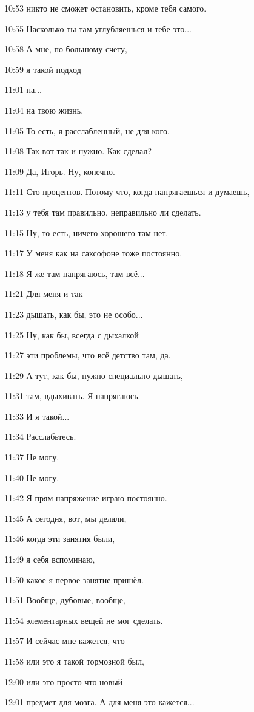 10:53
никто не сможет остановить, кроме тебя самого.

10:55
Насколько ты там углубляешься и тебе это...

10:58
А мне, по большому счету,

10:59
я такой подход

11:01
на...

11:04
на твою жизнь.

11:05
То есть, я расслабленный, не для кого.

11:08
Так вот так и нужно. Как сделал?

11:09
Да, Игорь. Ну, конечно.

11:11
Сто процентов. Потому что, когда напрягаешься и думаешь,

11:13
у тебя там правильно, неправильно ли сделать.

11:15
Ну, то есть, ничего хорошего там нет.

11:17
У меня как на саксофоне тоже постоянно.

11:18
Я же там напрягаюсь, там всё...

11:21
Для меня и так

11:23
дышать, как бы, это не особо...

11:25
Ну, как бы, всегда с дыхалкой

11:27
эти проблемы, что всё детство там, да.

11:29
А тут, как бы, нужно специально дышать,

11:31
там, вдыхивать. Я напрягаюсь.

11:33
И я такой...

11:34
Расслабьтесь.

11:37
Не могу.

11:40
Не могу.

11:42
Я прям напряжение играю постоянно.

11:45
А сегодня, вот, мы делали,

11:46
когда эти занятия были,

11:49
я себя вспоминаю,

11:50
какое я первое занятие пришёл.

11:51
Вообще, дубовые, вообще,

11:54
элементарных вещей не мог сделать.

11:57
И сейчас мне кажется, что

11:58
или это я такой тормозной был,

12:00
или это просто что новый

12:01
предмет для мозга. А для меня это кажется...

